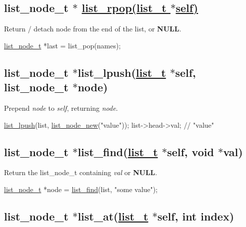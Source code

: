 \subsection*{list\+\_\+node\+\_\+t $\ast$ \hyperlink{list_8h_a53460b319b561ce2201bbf95450f1af7}{list\+\_\+rpop(list\+\_\+t $\ast$self)}}

Return / detach node from the end of the list, or {\bfseries N\+U\+LL}.


\begin{DoxyCode}
\hyperlink{structlist__node}{list\_node\_t} *last = list\_pop(names);
\end{DoxyCode}


\subsection*{list\+\_\+node\+\_\+t $\ast$list\+\_\+lpush(\hyperlink{structlist__t}{list\+\_\+t} $\ast$self, list\+\_\+node\+\_\+t $\ast$node)}

Prepend {\itshape node} to {\itshape self}, returning {\itshape node}.


\begin{DoxyCode}
\hyperlink{list_8c_a7e1b077416813dd474a54826347f7502}{list\_lpush}(list, \hyperlink{list_8h_a4ef36e0519514ac481d0d7e0b439d431}{list\_node\_new}(\textcolor{stringliteral}{"value"}));
list->head->val; \textcolor{comment}{// "value"}
\end{DoxyCode}


\subsection*{list\+\_\+node\+\_\+t $\ast$list\+\_\+find(\hyperlink{structlist__t}{list\+\_\+t} $\ast$self, void $\ast$val)}

Return the {\ttfamily list\+\_\+node\+\_\+t} containing {\itshape val} or {\bfseries N\+U\+LL}.


\begin{DoxyCode}
\hyperlink{structlist__node}{list\_node\_t} *node = \hyperlink{list_8c_a5d73352b7bfa0c5a8b33289d7b27a374}{list\_find}(list, \textcolor{stringliteral}{"some value"});
\end{DoxyCode}


\subsection*{list\+\_\+node\+\_\+t $\ast$list\+\_\+at(\hyperlink{structlist__t}{list\+\_\+t} $\ast$self, int index)}

